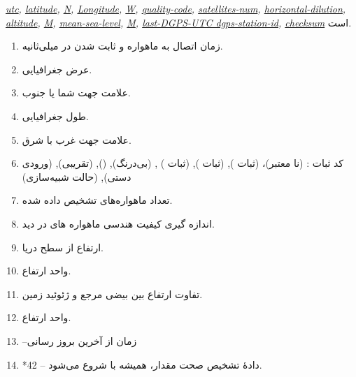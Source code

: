 \textit{
\hypersetup{linkcolor=gray}
\hyperref[i1:enum1:sec2:chap5]{utc},
\hyperref[i2:enum1:sec2:chap5]{latitude},
\hyperref[i3:enum1:sec2:chap5]{N},
\hyperref[i4:enum1:sec2:chap5]{Longitude},
\hyperref[i5:enum1:sec2:chap5]{W},
\hyperref[i6:enum1:sec2:chap5]{quality-code},
\hyperref[i7:enum1:sec2:chap5]{satellites-num},
\hyperref[i8:enum1:sec2:chap5]{horizontal-dilution},
\hyperref[i9:enum1:sec2:chap5]{altitude},
\hyperref[i10:enum1:sec2:chap5]{M},
\hyperref[i11:enum1:sec2:chap5]{mean-sea-level},
\hyperref[i12:enum1:sec2:chap5]{M},
\hyperref[i13:enum1:sec2:chap5]{last-DGPS-UTC \textbar{} dgps-station-id},
\hyperref[i14:enum1:sec2:chap5]{checksum}
}
است.
\begin{enumerate}[nosep]
    \item \label{i1:enum1:sec2:chap5} زمان اتصال به ماهواره و ثابت شدن در میلی‌ثانیه.
    \item \label{i2:enum1:sec2:chap5} عرض جغرافیایی.
    \item \label{i3:enum1:sec2:chap5} علامت جهت شما یا جنوب.
    \item \label{i4:enum1:sec2:chap5} طول جغرافیایی.
    \item \label{i5:enum1:sec2:chap5} علامت جهت غرب با شرق.
    \item \label{i6:enum1:sec2:chap5} کد ثبات :  (نا معتبر)،  (ثبات ),  (ثبات ), 
    (ثبات ) ,  (بی‌درنگ),  (),  (تقریبی),  (ورودی دستی), 
    (حالت شبیه‌سازی)
    \item \label{i7:enum1:sec2:chap5} تعداد ماهواره‌های تشخیص داده شده.
    \item \label{i8:enum1:sec2:chap5} اندازه گیری کیفیت هندسی ماهواره های  در دید.
    \item \label{i9:enum1:sec2:chap5} ارتفاع از سطح دریا.
    \item \label{i10:enum1:sec2:chap5} واحد ارتفاع.
    \item \label{i11:enum1:sec2:chap5} تفاوت ارتفاع بین بیضی مرجع  و ژئوئید زمین.
    \item \label{i12:enum1:sec2:chap5} واحد ارتفاع.
    \item \label{i13:enum1:sec2:chap5} --زمان از آخرین بروز رسانی 
    \item \label{i14:enum1:sec2:chap5}*42 -- دادهٔ تشخیص صحت مقدار، همیشه با \lrm{*} شروع می‌شود.
\end{enumerate}

